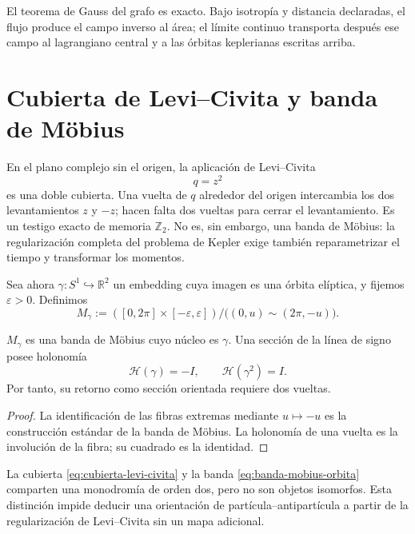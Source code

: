 El teorema de Gauss del grafo es exacto. Bajo isotropía y distancia
declaradas, el flujo produce el campo inverso al área; el límite continuo
transporta después ese campo al lagrangiano central y a las órbitas
keplerianas escritas arriba.

\section{Cubierta de Levi--Civita y banda de Möbius}
\label{sec:levi-civita-mobius-kepler}

En el plano complejo sin el origen, la aplicación de Levi--Civita
\[
 q=z^2
 \tag{K8}\label{eq:cubierta-levi-civita}
\]
es una doble cubierta. Una vuelta de \(q\) alrededor del origen intercambia
los dos levantamientos \(z\) y \(-z\); hacen falta dos vueltas para cerrar el
levantamiento. Es
un testigo exacto de memoria \(\mathbb Z_2\). No es, sin embargo, una banda
de Möbius: la regularización completa del problema de Kepler exige también
reparametrizar el tiempo y transformar los momentos.

Sea ahora \(\gamma:S^1\hookrightarrow\mathbb R^2\) un embedding cuya imagen
es una órbita elíptica, y fijemos \(\varepsilon>0\). Definimos
\[
 M_\gamma
 :=([0,2\pi]\times[-\varepsilon,\varepsilon])/
 \bigl((0,u)\sim(2\pi,-u)\bigr).
 \tag{K9}\label{eq:banda-mobius-orbita}
\]

\begin{theorem}
\label{thm:periodo-orientado-banda-orbital}
\(M_\gamma\) es una banda de Möbius cuyo núcleo es \(\gamma\). Una sección
de la línea de signo posee holonomía
\[
 \mathcal H(\gamma)=-I,
 \qquad
 \mathcal H(\gamma^2)=I.
 \tag{K10}\label{eq:holonomia-banda-orbital}
\]
Por tanto, su retorno como sección orientada requiere dos vueltas.
\end{theorem}

\begin{proof}
La identificación de las fibras extremas mediante \(u\mapsto-u\) es la
construcción estándar de la banda de Möbius. La holonomía de una vuelta es
la involución de la fibra; su cuadrado es la identidad.
\end{proof}

La cubierta \eqref{eq:cubierta-levi-civita} y la banda
\eqref{eq:banda-mobius-orbita} comparten una monodromía de orden dos, pero no
son objetos isomorfos. Esta distinción impide deducir una orientación de
partícula--antipartícula a partir de la regularización de Levi--Civita sin un
mapa adicional.

